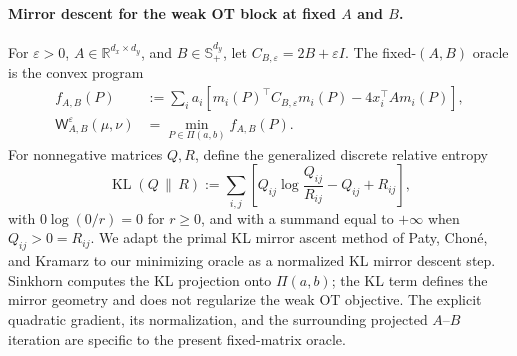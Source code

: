 \documentclass[11pt]{article}
\newcommand{\R}{\mathbb R}
\DeclareMathOperator{\KL}{KL}
\theoremstyle{plain}
\theoremstyle{definition}
\theoremstyle{remark}
\begin{document}
\paragraph{Mirror descent for the weak OT block at fixed \(A\) and \(B\).}
For \(\varepsilon>0\), \(A\in\R^{d_x\times d_y}\), and
\(B\in\mathbb S_+^{d_y}\), let \(C_{B,\varepsilon}=2B+\varepsilon I\). The
fixed-\((A,B)\) oracle is the convex program
\begin{equation}\label{eq:finite-weak-ot-oracle}
\begin{aligned}
  f_{A,B}(P)
  &:=\sum_i a_i[m_i(P)^\top C_{B,\varepsilon}m_i(P)-4x_i^\top A m_i(P)],\\
  \mathsf W_{A,B}^\varepsilon(\mu,\nu)
  &=\min_{P\in\Pi(a,b)} f_{A,B}(P).
\end{aligned}
\end{equation}
For nonnegative matrices \(Q,R\), define the generalized discrete relative
entropy
\[
 \KL(Q\,\|\,R)
 :=\sum_{i,j}\left[
 Q_{ij}\log\frac{Q_{ij}}{R_{ij}}-Q_{ij}+R_{ij}\right],
\]
with \(0\log(0/r)=0\) for \(r\ge0\), and with a summand equal to \(+\infty\)
when \(Q_{ij}>0=R_{ij}\). We adapt the primal KL mirror ascent method of Paty,
Chon\'e, and Kramarz \cite{PatyChoneKramarz2022} to our minimizing oracle as a
normalized KL mirror descent step. Sinkhorn computes the KL projection onto
\(\Pi(a,b)\); the KL term defines the mirror geometry and does not regularize the
weak OT objective. The explicit quadratic gradient, its normalization,
and the surrounding projected \(A\)--\(B\) iteration are specific to the present
fixed-matrix oracle.
\end{document}
